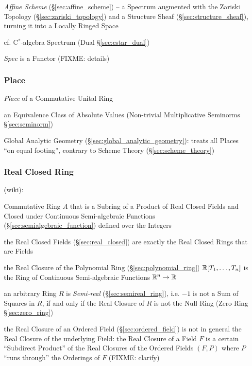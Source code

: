 \fist \emph{Affine Scheme} (\S\ref{sec:affine_scheme}) -- a Spectrum augmented
with the Zariski Topology (\S\ref{sec:zariski_topology}) and a Structure Sheaf
(\S\ref{sec:structure_sheaf}), turning it into a Locally Ringed Space

\fist cf. C$^*$-algebra Spectrum (Dual \S\ref{sec:cstar_dual})

$Spec$ is a Functor (FIXME: details)



\subsubsection{Place}\label{sec:place}

\emph{Place} of a Commutative Unital Ring

an Equivalence Class of Absolute Values (Non-trivial Multiplicative Seminorms
\S\ref{sec:seminorm})

\fist Global Analytic Geometry (\S\ref{sec:global_analytic_geometry}): treats
all Places ``on equal footing'', contrary to Scheme Theory
(\S\ref{sec:scheme_theory})



\subsubsection{Real Closed Ring}\label{sec:real_closed_ring}

(wiki):

Commutative Ring $A$ that is a Subring of a Product of Real Closed Fields and
Closed under Continuous Semi-algebraic Functions
(\S\ref{sec:semialgebraic_function}) defined over the Integers

the Real Closed Fields (\S\ref{sec:real_closed}) are exactly the Real Closed
Rings that are Fields

the Real Closure of the Polynomial Ring (\S\ref{sec:polynomial_ring})
$\mathbb{R}[T_1,\ldots,T_n]$ is the Ring of Continuous Semi-algebraic Functions
$\mathbb{R}^n \rightarrow \mathbb{R}$

an arbitrary Ring $R$ is \emph{Semi-real} (\S\ref{sec:semireal_ring}), i.e.
$-1$ is not a Sum of Squares in $R$, if and only if the Real Closure of $R$ is
not the Null Ring (Zero Ring \S\ref{sec:zero_ring})

the Real Closure of an Ordered Field (\S\ref{sec:ordered_field}) is not in
general the Real Closure of the underlying Field: the Real Closure of a Field
$F$ is a certain ``Subdirect Product'' of the Real Closures of the Ordered
Fields $(F,P)$ where $P$ ``runs through'' the Orderings of $F$ (FIXME: clarify)

